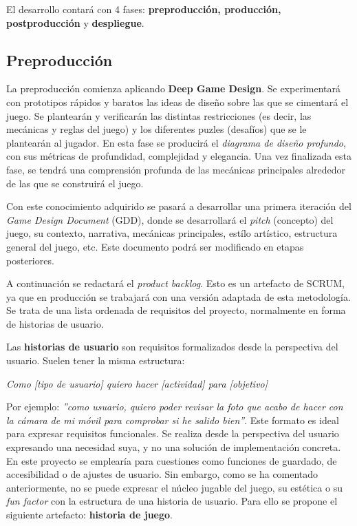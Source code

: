 El desarrollo contará con 4 fases: \textbf{preproducción, producción, postproducción} y \textbf{despliegue}.

\subsection{Preproducción}

La preproducción comienza aplicando \textbf{Deep Game Design}\cite{deepdesign}. Se experimentará con prototipos rápidos y baratos las ideas de diseño sobre las que se cimentará el juego. Se plantearán y verificarán las distintas restricciones (es decir, las mecánicas y reglas del juego) y los diferentes puzles (desafíos) que se le plantearán al jugador. En esta fase se producirá el \textit{diagrama de diseño profundo}, con sus métricas de profundidad, complejidad y elegancia. Una vez finalizada esta fase, se tendrá una comprensión profunda de las mecánicas principales alrededor de las que se construirá el juego.

Con este conocimiento adquirido se pasará a desarrollar una primera iteración del \textit{Game Design Document} (GDD), donde se desarrollará el \textit{pitch} (concepto) del juego, su contexto, narrativa, mecánicas principales, estílo artístico, estructura general del juego, etc. Este documento podrá ser modificado en etapas posteriores.

A continuación se redactará el \textit{product backlog}. Esto es un artefacto de SCRUM, ya que en producción se trabajará con una versión adaptada de esta metodología. Se trata de una lista ordenada de requisitos del proyecto, normalmente en forma de historias de usuario.

Las \textbf{historias de usuario} son requisitos formalizados desde la perspectiva del usuario. Suelen tener la misma estructura:\\ 


\centerline{\textit{Como [tipo de usuario] quiero hacer [actividad] para [objetivo]}}

Por ejemplo: \textit{''como usuario, quiero poder revisar la foto que acabo de hacer con la cámara de mi móvil para comprobar si he salido bien''}. Este formato es ideal para expresar requisitos funcionales. Se realiza desde la perspectiva del usuario expresando una necesidad suya, y no una solución de implementación concreta. En este proyecto se emplearía para cuestiones como funciones de guardado, de accesibilidad o de ajustes de usuario. Sin embargo, como se ha comentado anteriormente, no se puede expresar el núcleo jugable del juego, su estética o su \textit{fun factor} con la estructura de una historia de usuario. Para ello se propone el siguiente artefacto: \textbf{historia de juego}.

